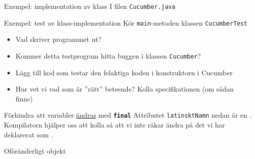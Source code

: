 \documentclass{lecturenotes}
\begin{document}
\begin{Slide}{Exempel: implementation av klass}
\scriptsize I filen \texttt{Cucumber.java}

\end{Slide}

\begin{Slide}{Exempel: test av klass-implementation}
\scriptsize Kör \texttt{main}-metoden klassen \texttt{CucumberTest} 

\begin{itemize}
\item Vad skriver programmet ut?
\item Kommer detta testprogram hitta buggen i klassen \texttt{Cucumber}?
\item Lägg till kod som testar den felaktiga koden i konstruktorn i Cucumber
\item Hur vet vi vad som är ''rätt'' beteende? \pause Kolla specifikationen (om sådan finns)
\end{itemize}
\end{Slide}

\begin{Slide}{Förhindra att variabler \href{https://docs.oracle.com/javase/tutorial/essential/concurrency/immutable.html}{ändras} med \texttt{\textbf{final}}}
Attributet \texttt{latinsktNamn} nedan är en .\\ Kompilatorn hjälper oss att kolla så att vi inte råkar ändra på det vi har deklarerat som .

\end{Slide}

\begin{Slide}{Oföränderligt objekt}

\end{Slide}
\end{document}
